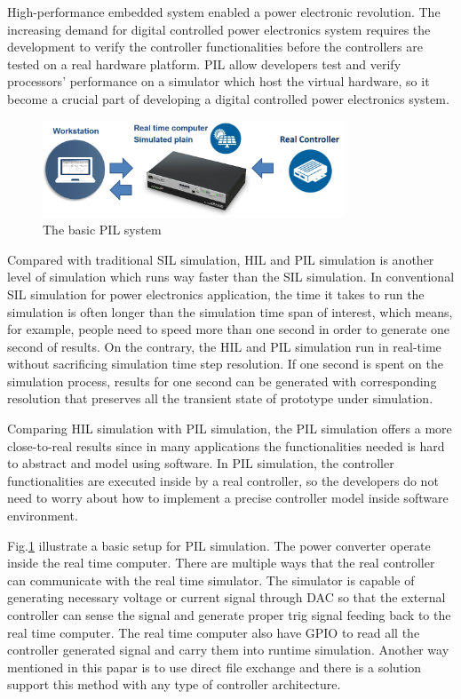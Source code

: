 High-performance embedded system enabled a power electronic revolution. The increasing demand for digital controlled power electronics system requires the development to verify the controller functionalities before the controllers are tested on a real hardware platform. \gls{PIL} allow developers test and verify processors' performance on a simulator which host the virtual hardware, so it become a crucial part of developing a digital controlled power electronics system.  
\begin{figure}[b]
    \centering
    \includegraphics[width = 0.8\textwidth]{figures/pil.png}
    \caption{The basic PIL system}
    \label{fig:pil sys}
\end{figure}

Compared with traditional \gls{SIL} simulation, \gls{HIL} and \gls{PIL} simulation is another level of simulation which runs way faster than the \gls{SIL} simulation. In conventional \gls{SIL} simulation for power electronics application, the time it takes to run the simulation is often longer than the simulation time span of interest, which means, for example,  people need to speed more than one second in order to generate one second of results. On the contrary, the \gls{HIL} and \gls{PIL} simulation run in real-time without sacrificing simulation time step resolution. If one second is spent on the simulation process, results for one second can be generated with corresponding resolution that preserves all the transient state of prototype under simulation. 

Comparing \gls{HIL} simulation with \gls{PIL} simulation, the \gls{PIL} simulation offers a more close-to-real results since in many applications the functionalities needed is hard to abstract and model using software. In \gls{PIL} simulation, the controller functionalities are executed inside by a real controller, so the developers do not need to worry about how to implement a precise controller model inside software environment.

Fig.\ref{fig:pil sys} illustrate a basic setup for \gls{PIL} simulation. The power converter operate inside the real time computer. There are  multiple ways that the real controller can communicate with the real time simulator. The simulator is capable of generating necessary voltage or current signal through \gls{DAC} so that the external controller can sense the signal and generate proper trig signal feeding back to the real time computer. The real time computer also have \gls{GPIO} to read all the controller generated signal and carry them into runtime simulation. Another way mentioned in this papar\cite{7497546} is to use direct file exchange and there is a solution support this method with any type of controller architecture. 

